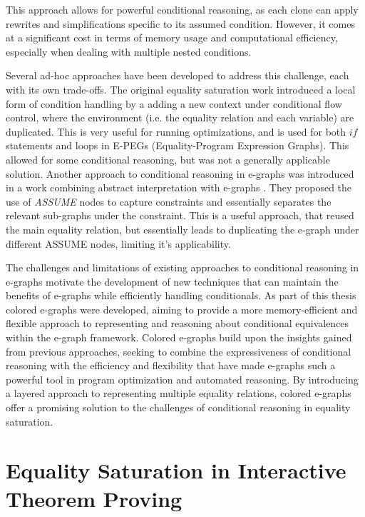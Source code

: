 This approach allows for powerful conditional reasoning, as each clone can apply rewrites and simplifications specific to its assumed condition. However, it comes at a significant cost in terms of memory usage and computational efficiency, especially when dealing with multiple nested conditions.

Several ad-hoc approaches have been developed to address this challenge, each with its own trade-offs.
The original equality saturation work \cite{eqsat} introduced a local form of condition handling by a adding a new context under conditional flow control, where the environment (i.e. the equality relation and each variable) are duplicated.
This is very useful for running optimizations, and is used for both $if$ statements and loops in E-PEGs (Equality-Program Expression Graphs).
This allowed for some conditional reasoning, but was not a generally applicable solution.
Another approach to conditional reasoning in e-graphs was introduced in a work combining abstract interpretation with e-graphs \cite{abstracteqsat}.
They proposed the use of \emph{ASSUME} nodes to capture constraints and essentially separates the relevant sub-graphs under the constraint.
This is a useful approach, that reused the main equality relation, but essentially leads to duplicating the e-graph under different ASSUME nodes, limiting it's applicability.

The challenges and limitations of existing approaches to conditional reasoning in e-graphs motivate the development of new techniques that can maintain the benefits of e-graphs while efficiently handling conditionals. 
As part of this thesis colored e-graphs were developed, aiming to provide a more memory-efficient and flexible approach to representing and reasoning about conditional equivalences within the e-graph framework.
Colored e-graphs build upon the insights gained from previous approaches, seeking to combine the expressiveness of conditional reasoning with the efficiency and flexibility that have made e-graphs such a powerful tool in program optimization and automated reasoning. 
By introducing a layered approach to representing multiple equality relations, colored e-graphs offer a promising solution to the challenges of conditional reasoning in equality saturation.


\section{Equality Saturation in Interactive Theorem Proving}

